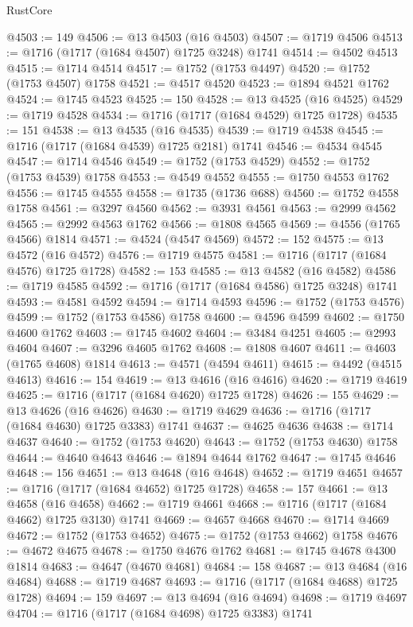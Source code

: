 \begin{lexlean}{RustCore}
\begin{coremodule}
@4503 := 149
@4506 := @13 @4503 (@16 @4503)
@4507 := @1719 @4506
@4513 := @1716 (@1717 (@1684 @4507) @1725 @3248) @1741
@4514 := @4502 @4513
@4515 := @1714 @4514
@4517 := @1752 (@1753 @4497)
@4520 := @1752 (@1753 @4507) @1758
@4521 := @4517 @4520
@4523 := @1894 @4521 @1762
@4524 := @1745 @4523
@4525 := 150
@4528 := @13 @4525 (@16 @4525)
@4529 := @1719 @4528
@4534 := @1716 (@1717 (@1684 @4529) @1725 @1728)
@4535 := 151
@4538 := @13 @4535 (@16 @4535)
@4539 := @1719 @4538
@4545 := @1716 (@1717 (@1684 @4539) @1725 @2181) @1741
@4546 := @4534 @4545
@4547 := @1714 @4546
@4549 := @1752 (@1753 @4529)
@4552 := @1752 (@1753 @4539) @1758
@4553 := @4549 @4552
@4555 := @1750 @4553 @1762
@4556 := @1745 @4555
@4558 := @1735 (@1736 @688)
@4560 := @1752 @4558 @1758
@4561 := @3297 @4560
@4562 := @3931 @4561
@4563 := @2999 @4562
@4565 := @2992 @4563 @1762
@4566 := @1808 @4565
@4569 := @4556 (@1765 @4566) @1814
@4571 := @4524 (@4547 @4569)
@4572 := 152
@4575 := @13 @4572 (@16 @4572)
@4576 := @1719 @4575
@4581 := @1716 (@1717 (@1684 @4576) @1725 @1728)
@4582 := 153
@4585 := @13 @4582 (@16 @4582)
@4586 := @1719 @4585
@4592 := @1716 (@1717 (@1684 @4586) @1725 @3248) @1741
@4593 := @4581 @4592
@4594 := @1714 @4593
@4596 := @1752 (@1753 @4576)
@4599 := @1752 (@1753 @4586) @1758
@4600 := @4596 @4599
@4602 := @1750 @4600 @1762
@4603 := @1745 @4602
@4604 := @3484 @4251
@4605 := @2993 @4604
@4607 := @3296 @4605 @1762
@4608 := @1808 @4607
@4611 := @4603 (@1765 @4608) @1814
@4613 := @4571 (@4594 @4611)
@4615 := @4492 (@4515 @4613)
@4616 := 154
@4619 := @13 @4616 (@16 @4616)
@4620 := @1719 @4619
@4625 := @1716 (@1717 (@1684 @4620) @1725 @1728)
@4626 := 155
@4629 := @13 @4626 (@16 @4626)
@4630 := @1719 @4629
@4636 := @1716 (@1717 (@1684 @4630) @1725 @3383) @1741
@4637 := @4625 @4636
@4638 := @1714 @4637
@4640 := @1752 (@1753 @4620)
@4643 := @1752 (@1753 @4630) @1758
@4644 := @4640 @4643
@4646 := @1894 @4644 @1762
@4647 := @1745 @4646
@4648 := 156
@4651 := @13 @4648 (@16 @4648)
@4652 := @1719 @4651
@4657 := @1716 (@1717 (@1684 @4652) @1725 @1728)
@4658 := 157
@4661 := @13 @4658 (@16 @4658)
@4662 := @1719 @4661
@4668 := @1716 (@1717 (@1684 @4662) @1725 @3130) @1741
@4669 := @4657 @4668
@4670 := @1714 @4669
@4672 := @1752 (@1753 @4652)
@4675 := @1752 (@1753 @4662) @1758
@4676 := @4672 @4675
@4678 := @1750 @4676 @1762
@4681 := @1745 @4678 @4300 @1814
@4683 := @4647 (@4670 @4681)
@4684 := 158
@4687 := @13 @4684 (@16 @4684)
@4688 := @1719 @4687
@4693 := @1716 (@1717 (@1684 @4688) @1725 @1728)
@4694 := 159
@4697 := @13 @4694 (@16 @4694)
@4698 := @1719 @4697
@4704 := @1716 (@1717 (@1684 @4698) @1725 @3383) @1741

\end{coremodule}
\end{lexlean}
